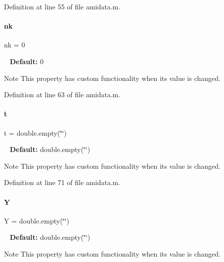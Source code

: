 Definition at line 55 of file amidata.\+m.

\mbox{\label{classamidata_afd6bea572754e0c3c320664bdccf0200}} 
\paragraph{\texorpdfstring{nk}{nk}}
{\footnotesize\ttfamily nk = 0}

~\newline
{\bfseries Default\+:} 0

\begin{DoxyNote}{Note}
This property has custom functionality when its value is changed. 
\end{DoxyNote}


Definition at line 63 of file amidata.\+m.

\mbox{\label{classamidata_aaccc9105df5383111407fd5b41255e23}} 
\paragraph{\texorpdfstring{t}{t}}
{\footnotesize\ttfamily t = double.\+empty(\char`\"{}\char`\"{})}

~\newline
{\bfseries Default\+:} double.\+empty(\char`\"{}\char`\"{})

\begin{DoxyNote}{Note}
This property has custom functionality when its value is changed. 
\end{DoxyNote}


Definition at line 71 of file amidata.\+m.

\mbox{\label{classamidata_a0867f43e27585e019c13f7f4b7c4ab6b}} 
\paragraph{\texorpdfstring{Y}{Y}}
{\footnotesize\ttfamily Y = double.\+empty(\char`\"{}\char`\"{})}

~\newline
{\bfseries Default\+:} double.\+empty(\char`\"{}\char`\"{})

\begin{DoxyNote}{Note}
This property has custom functionality when its value is changed. 
\end{DoxyNote}



